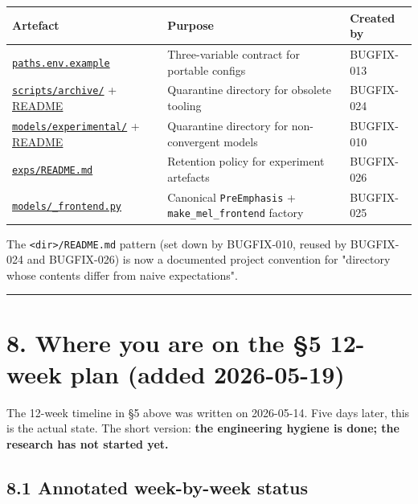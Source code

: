 \documentclass[10pt,a4paper]{article}
\renewcommand{\arraystretch}{1.15}
\begin{document}
\begin{center}
\small
\renewcommand{\arraystretch}{1.25}
\begin{tabularx}{\textwidth}{|Y|Y|Y|}
\hline
Artefact & Purpose & Created by \\
\hline
\href{paths.env.example}{\texttt{paths.env.example}} & Three-variable contract for portable configs & BUGFIX-013 \\
\hline
\href{scripts/archive/}{\texttt{scripts/archive/}} + \href{scripts/archive/README.md}{README} & Quarantine directory for obsolete tooling & BUGFIX-024 \\
\hline
\href{models/experimental/}{\texttt{models/experimental/}} + \href{models/experimental/README.md}{README} & Quarantine directory for non-convergent models & BUGFIX-010 \\
\hline
\href{exps/README.md}{\texttt{exps/README.md}} & Retention policy for experiment artefacts & BUGFIX-026 \\
\hline
\href{models/_frontend.py}{\texttt{models/\_frontend.py}} & Canonical \texttt{PreEmphasis} + \texttt{make\_mel\_frontend} factory & BUGFIX-025 \\
\hline
\end{tabularx}
\end{center}

The \texttt{<dir>/README.md} pattern (set down by BUGFIX-010, reused by BUGFIX-024 and BUGFIX-026) is now a documented project convention for "directory whose contents differ from naive expectations".

\vspace{0.5em}\hrule\vspace{0.5em}

\section*{8. Where you are on the §5 12-week plan (added 2026-05-19)}

The 12-week timeline in §5 above was written on 2026-05-14. Five days later, this is the actual state. The short version: \textbf{the engineering hygiene is done; the research has not started yet.}

\subsection*{8.1 Annotated week-by-week status}
\end{document}
